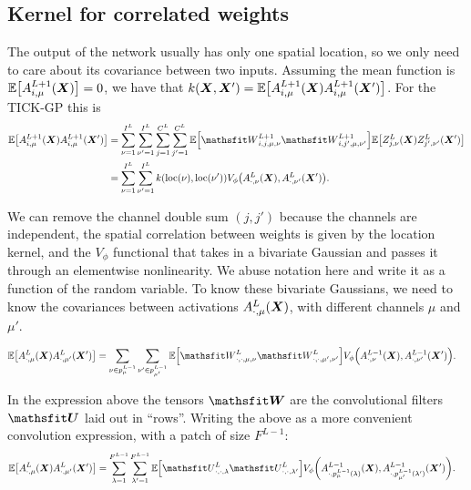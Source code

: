 \documentclass{article} %
\newcommand{\bracket}[3]{{\left#1 #3 \right#2}}
\newcommand{\bra}{\bracket{(}{)}}
\newcommand{\sqb}{\bracket{[}{]}}
\newcommand{\ssup}[1]{^{#1}}
\begin{document}
\subsection{Kernel for correlated weights}

The output of the network usually has only one spatial location, so we only need to care about its covariance between two inputs. Assuming the mean function is $\E\sqb{\emA_{i,\mu}\ssup{L+1}(\mX)} = 0$, we have that $k(\mX, \mX') = \E\sqb{\emA_{i,\mu}\ssup{L+1}(\mX)\emA_{i,\mu}\ssup{L+1}(\mX')}$. For the TICK-GP this is
\begin{align}
\E\sqb{\emA_{i,\mu}\ssup{L+1}(\mX)\emA_{i,\mu}\ssup{L+1}(\mX')} &=
\sum_{\nu=1}^{I^L} \sum_{\nu'=1}^{I^L} \sum_{j=1}^{C^L} \sum_{j'=1}^{C^L} \E\sqb{\etW\ssup{L+1}_{i,j,\mu,\nu}\etW\ssup{L+1}_{i,j',\mu,\nu'}}
\E\sqb{\emZ\ssup{L}_{j,\nu}(\mX) \emZ\ssup{L}_{j',\nu'}(\mX')} \\
&= \sum_{\nu=1}^{I^L} \sum_{\nu'=1}^{I^L}k(\text{loc}(\nu), \text{loc}(\nu')) V_\phi\bra{\emA\ssup{L}_{\cdot,\nu}(\mX), \emA\ssup{L}_{\cdot,\nu'}(\mX')}.
\end{align}

We can remove the channel double sum $(j, j')$ because the channels are independent, the spatial correlation between weights is given by the location kernel, and the $V_\phi$ functional that takes in a bivariate Gaussian and passes it through an elementwise nonlinearity. We abuse notation here and write it as a function of the random variable. To know these bivariate Gaussians, we need to know the covariances between activations $\emA_{\cdot,\mu}\ssup{L}(\mX)$, with different channels $\mu$ and $\mu'$.

\begin{align}
\E\sqb{\emA_{\cdot,\mu}\ssup{L}(\mX)\emA_{\cdot,\mu'}\ssup{L}(\mX')} &=
\sum_{\nu \in p_\mu^{L-1}} \sum_{\nu'\in p_{\mu'}^{L-1}} \E\sqb{\etW\ssup{L}_{\cdot,\cdot,\mu,\nu}\etW\ssup{L}_{\cdot,\cdot,\mu',\nu'}} V_\phi\bra{\emA\ssup{L-1}_{\cdot,\nu}(\mX), \emA\ssup{L-1}_{\cdot,\nu'}(\mX')}.
\end{align}

In the expression above the tensors $\tW$ are the convolutional filters $\tU$ laid out in ``rows''. Writing the above as a more convenient convolution expression, with a patch of size $F^{L-1}$:
\begin{align}
\E\sqb{\emA_{\cdot,\mu}\ssup{L}(\mX)\emA_{\cdot,\mu'}\ssup{L}(\mX')} &=
\sum_{\lambda=1}^{F^{L-1}} \sum_{\lambda'=1}^{F^{L-1}}
\E\sqb{\etU\ssup{L}_{\cdot,\cdot,\lambda}\etU\ssup{L}_{\cdot,\cdot,\lambda'}}
V_\phi\bra{\emA\ssup{L-1}_{\cdot,p_{\mu}^{L-1}(\lambda)}(\mX), \emA\ssup{L-1}_{\cdot,p_{\mu'}^{L-1}(\lambda')}(\mX')}.
\label{eq:full-cov}
\end{align}
\end{document}
